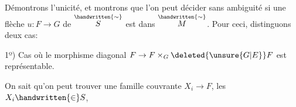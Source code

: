 Démontrons l'unicité, et montrons que l'on peut décider sans ambiguité si une flèche $u:F\to G$ de $\overset{\handwritten{\sim}}{S}$ est dans $\overset{\handwritten{\sim}}{M}$. Pour ceci, distinguons deux cas:

1º) Cas où le morphisme diagonal $F\to F\times_G\deleted{\unsure{G|E}}F$ est représentable. 

On sait qu'on peut trouver une famille couvrante $X_i\to F$, les $X_i\handwritten{\in} S$,

